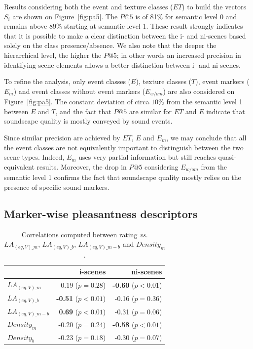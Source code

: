 \documentclass[twoside,twocolumn]{article}
\begin{document}
Results considering both the event and texture classes ($ET$) to build the vectors  $S_i$ are shown on Figure~\ref{fig:pa5}. The $P@5$ is of 81\% for semantic level 0 and remains above 89\% starting at semantic level 1. These result strongly indicates that it is possible to make a clear distinction between the i- and ni-scenes based solely on the class presence/absence. We also note that the deeper the hierarchical level, the higher the $P@5$; in other words an increased precision in identifying scene elements allows a better distinction between i- and ni-scenes. 

To refine the analysis, only event classes ($E$), texture classes ($T$), event markers ($E_m$) and event classes without event markers ($E_{w/o m}$) are also considered on Figure~\ref{fig:pa5}. The constant deviation of circa $10\%$ from the semantic level 1 between $E$ and $T$, and the fact that $P@5$ are similar for $ET$ and $E$ indicate that soundscape quality is mostly conveyed by sound events.

Since similar precision are achieved by $ET$, $E$ and $E_m$, we may conclude that all the event classes are not equivalently important to distinguish between the two scene types. Indeed, $E_m$ uses very partial information but still reaches quasi-equivalent results. Moreover, the drop in $P@5$ considering $E_{w/o m}$ from the semantic level 1 confirms the fact that soundscape quality mostly relies on the presence of specific sound markers.


\subsection{Marker-wise pleasantness descriptors}
\label{sec:QuantifyingMarkers}

\begin{table}[t]
\centering
\begin{tabular}{l r r} 
                    &   i-scenes   & ni-scenes \\
\hline
$LA_{(eq,V)\_m}$    & 0.19  ($p=0.28$)           & \textbf{-0.60} ($p<0.01$) \\
$LA_{(eq,V)\_b}$    & \textbf{-0.51} ($p<0.01$)  & -0.16 ($p=0.36$) \\
$LA_{(eq,V)\_m-b}$  & \textbf{0.69} ($p<0.01$)   & -0.31 ($p=0.06$) \\
$Density_{m}$       & -0.20  ($p=0.24$)          & \textbf{-0.58} ($p<0.01$)  \\
$Density_{b}$       & -0.23  ($p=0.18$)          & -0.30 ($p=0.07$)  \\
\hline
\end{tabular}
\vspace{0.5mm}
\caption{\label{tab:numMarkers} Correlations computed between rating \emph{vs.} $LA_{(eq,V)\_m}$, $LA_{(eq,V)\_b}$, $LA_{(eq,V)\_m-b}$ and $Density_m$.}
\end{table}
\end{document}
